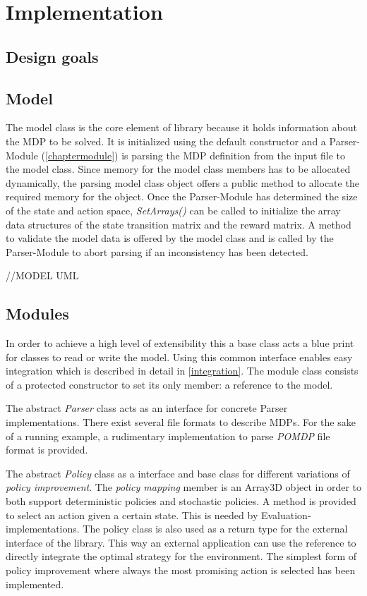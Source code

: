 \chapter{Implementation}

\section{Design goals}



\section{Model}

The model class is the core element of library because it holds information about the MDP to be solved. It is initialized using the default constructor and a Parser-Module (\autoref{chaptermodule}) is parsing the MDP definition from the input file to the model class. Since memory for the model class members has to be allocated dynamically, the parsing model class object offers a public method to allocate the required memory for the object. Once the Parser-Module has determined the size of the state and action space, \emph{SetArrays()} can be called to initialize the array data structures of the state transition matrix and the reward matrix. A method to validate the model data is offered by the model class and is called by the Parser-Module to abort parsing if an inconsistency has been detected. 

//MODEL UML

\section{Modules}
\label{chaptermodule}

In order to achieve a high level of extensibility this a base class acts a blue print for classes to read or write the model. Using this common interface enables easy integration which is described in detail in \autoref{integration}. The module class consists of a protected constructor to set its only member: a reference to the model. 

The abstract \emph{Parser} class acts as an interface for concrete Parser implementations. There exist several file formats to describe MDPs. For the sake of a running example, a rudimentary implementation to parse \emph{POMDP} file format \autocite{Cassandra} is provided. 

The abstract \emph{Policy} class as a interface and base class for different variations of \emph{policy improvement}. The \emph{policy mapping } member is an Array3D object in order to both support deterministic policies and stochastic policies. A method is provided to select an action given a certain state. This is needed by Evaluation-implementations. The policy class is also used as a return type for the external interface of the library. This way an external application can use the reference to directly integrate the optimal strategy for the environment. 
The simplest form of policy improvement where always the most promising action is selected has been implemented. 

